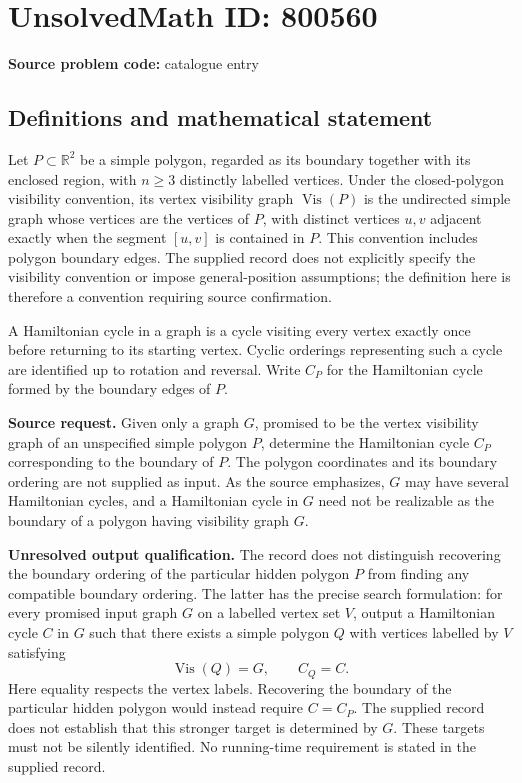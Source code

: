 \documentclass[11pt]{article}
\newcommand{\R}{\mathbb{R}}
\begin{document}
\section*{UnsolvedMath ID: 800560}
\textbf{Source problem code:} catalogue entry
\subsection{Definitions and mathematical statement}
Let \(P\subset\R^2\) be a simple polygon, regarded as its boundary together with its enclosed region, with \(n\geq3\) distinctly labelled vertices. Under the closed-polygon visibility convention, its vertex visibility graph \(\operatorname{Vis}(P)\) is the undirected simple graph whose vertices are the vertices of \(P\), with distinct vertices \(u,v\) adjacent exactly when the segment \([u,v]\) is contained in \(P\). This convention includes polygon boundary edges. The supplied record does not explicitly specify the visibility convention or impose general-position assumptions; the definition here is therefore a convention requiring source confirmation.

A Hamiltonian cycle in a graph is a cycle visiting every vertex exactly once before returning to its starting vertex. Cyclic orderings representing such a cycle are identified up to rotation and reversal. Write \(C_P\) for the Hamiltonian cycle formed by the boundary edges of \(P\).

\textbf{Source request.} Given only a graph \(G\), promised to be the vertex visibility graph of an unspecified simple polygon \(P\), determine the Hamiltonian cycle \(C_P\) corresponding to the boundary of \(P\). The polygon coordinates and its boundary ordering are not supplied as input. As the source emphasizes, \(G\) may have several Hamiltonian cycles, and a Hamiltonian cycle in \(G\) need not be realizable as the boundary of a polygon having visibility graph \(G\).

\textbf{Unresolved output qualification.} The record does not distinguish recovering the boundary ordering of the particular hidden polygon \(P\) from finding any compatible boundary ordering. The latter has the precise search formulation: for every promised input graph \(G\) on a labelled vertex set \(V\), output a Hamiltonian cycle \(C\) in \(G\) such that there exists a simple polygon \(Q\) with vertices labelled by \(V\) satisfying
\[
\operatorname{Vis}(Q)=G,\qquad C_Q=C.
\]
Here equality respects the vertex labels. Recovering the boundary of the particular hidden polygon would instead require \(C=C_P\). The supplied record does not establish that this stronger target is determined by \(G\). These targets must not be silently identified. No running-time requirement is stated in the supplied record.
\end{document}
